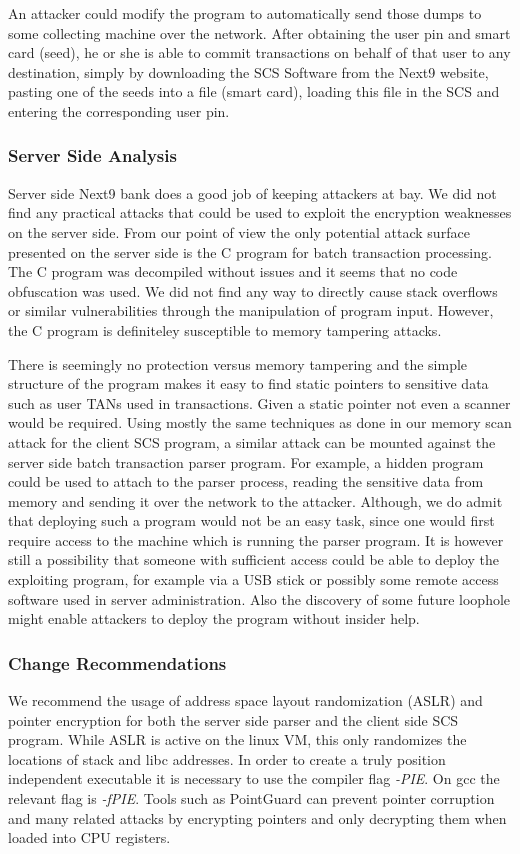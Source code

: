 \documentclass{llncs}
\begin{document}
An attacker could modify the program to automatically send those dumps to some collecting machine over the network. After obtaining the user pin and smart card (seed), he or she is able to commit transactions on behalf of that user to any destination, simply by downloading the SCS Software from the Next9 website, pasting one of the seeds into a file (smart card), loading this file in the SCS and entering the corresponding user pin.

\subsubsection{Server Side Analysis}
Server side Next9 bank does a good job of keeping attackers at bay. We did not find any practical attacks that could be used to exploit the encryption weaknesses on the server side. From our point of view the only potential attack surface presented on the server side is the C program for batch transaction processing. The C program was decompiled without issues and it seems that no code obfuscation was used. We did not find any way to directly cause stack overflows or similar vulnerabilities through the manipulation of program input. However, the C program is definiteley susceptible to memory tampering attacks. 

There is seemingly no protection versus memory tampering and the simple structure of the program makes it easy to find static pointers to sensitive data such as user TANs used in transactions. Given a static pointer not even a scanner would be required. Using mostly the same techniques as done in our memory scan attack for the client SCS program, a similar attack can be mounted against the server side batch transaction parser program. For example, a hidden program could be used to attach to the parser process, reading the sensitive data from memory and sending it over the network to the attacker. Although, we do admit that deploying such a program would not be an easy task, since one would first require access to the machine which is running the parser program. It is however still a possibility that someone with sufficient access could be able to deploy the exploiting program, for example via a USB stick or possibly some remote access software used in server administration. Also the discovery of some future loophole might enable attackers to deploy the program without insider help.

\subsubsection{Change Recommendations}
We recommend the usage of address space layout randomization (ASLR) and pointer encryption for both the server side parser and the client side SCS program. While ASLR is active on the linux VM, this only randomizes the locations of stack and libc addresses. In order to create a truly position independent executable it is necessary to use the compiler flag \emph{-PIE}. On gcc the relevant flag is \emph{-fPIE}. Tools such as PointGuard can prevent pointer corruption and many related attacks by encrypting pointers and only decrypting them when loaded into CPU registers.
\end{document}
